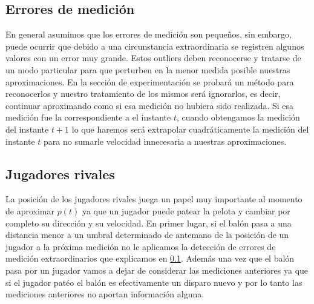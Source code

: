 \subsection{Errores de medición}\label{ssec:errores_de_medicion}
En general asumimos que los errores de medición son pequeños, sin embargo, puede ocurrir que debido a una circunstancia extraordinaria
se registren algunos valores con un error muy grande. Estos outliers deben reconocerse y tratarse de un modo particular para que perturben en
la menor medida posible nuestras aproximaciones. En la sección de experimentación se probará un método para reconocerlos y nuestro 
tratamiento de los mismos será ignorarlos, es decir, continuar aproximando como si esa medición no hubiera sido realizada. Si esa medición
fue la correspondiente a el instante $t$, cuando obtengamos la medición del instante $t+1$ lo que haremos será extrapolar cuadráticamente
la medición del instante $t$ para no sumarle velocidad innecesaria a nuestras aproximaciones.

\subsection{Jugadores rivales}
La posición de los jugadores rivales juega un papel muy importante al momento de aproximar $p(t)$ ya que un jugador puede 
patear la pelota y cambiar por completo su dirección y su velocidad. En primer lugar, si el balón pasa a una distancia menor a un umbral
determinado de antemano de la posición de un jugador a la próxima medición no le aplicamos la detección de errores de medición
extraordinarios que explicamos en \ref{ssec:errores_de_medicion}. Además una vez que el balón pasa por un jugador vamos a 
dejar de considerar las mediciones anteriores ya que si el jugador patéo el balón es efectivamente un disparo nuevo y por lo tanto las
mediciones anteriores no aportan información alguna.

















